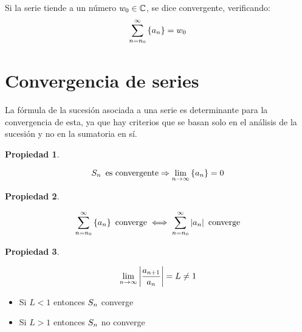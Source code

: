 \documentclass[a5paper,12pt,twoside]{book}
\newtheorem{prop}{{Propiedad}}[chapter]
\begin{document}
Si la serie tiende a un número $w_0 \in \mathbb{C}$, se dice convergente, verificando:
\begin{equation*}
    \sum_{n=n_0}^ \infty { \left\{ {a_n} \right\} } = w_0
\end{equation*}


\section{Convergencia de series}

La fórmula de la sucesión asociada a una serie es determinante para la convergencia de esta, ya que hay criterios que se basan solo en el análisis de la sucesión y no en la sumatoria en sí.

\begin{mdframed}[style=PropertyFrame]
    \begin{prop}
    \end{prop}
    \begin{equation*}
        S_n \enspace \textrm{es convergente} \Rightarrow \lim_{n\to\infty} { \left\{ {a_n} \right\} } = 0
    \end{equation*}
\end{mdframed}

\begin{mdframed}[style=PropertyFrame]
    \begin{prop}
    \end{prop}
    \begin{equation*}
        \sum_{n=n_0}^\infty { \left\{ {a_n} \right\} } \enspace \textrm{converge} \iff \sum_{n=n_0}^\infty {\left| {a_n} \right|} \enspace \textrm{converge}
    \end{equation*}
\end{mdframed}

\begin{mdframed}[style=PropertyFrame]
    \begin{prop}
        \label{prop:DAlembert}
    \end{prop}
    \begin{equation*}
        \lim_{n\to\infty} {\left| {\frac{a_{n+1}}{a_n}} \right|} = L \neq 1
    \end{equation*}
    \begin{itemize}
        \item Si $L<1$ entonces $S_n$ converge
        \item Si $L>1$ entonces $S_n$ no converge
    \end{itemize}
\end{mdframed}
\end{document}
